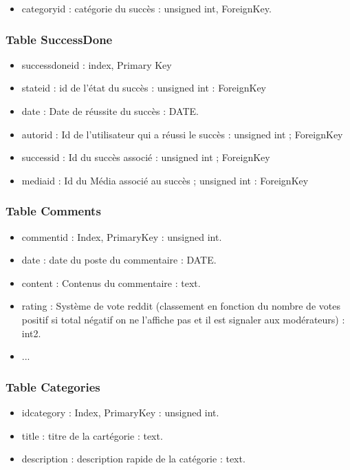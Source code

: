\documentclass[a4paper,10pt]{article}
\begin{document}
\begin{itemize}
\item categoryid : catégorie du succès : unsigned int, ForeignKey.
\end{itemize}

\subsubsection{Table SuccessDone}

\begin{itemize}
\item successdoneid : index, Primary Key
\item stateid : id de l'état du succès : unsigned int : ForeignKey 
\item date : Date de réussite du succès : DATE.
\item autorid : Id de l'utilisateur qui a réussi le succès : unsigned int ; ForeignKey
\item successid : Id du succès associé : unsigned int ; ForeignKey
\item mediaid : Id du Média associé au succès ; unsigned int : ForeignKey
\end{itemize}

\subsubsection{Table Comments}

\begin{itemize}
\item commentid : Index, PrimaryKey : unsigned int.
\item date : date du poste du commentaire : DATE.
\item content : Contenus du commentaire : text.
\item rating : Système de vote reddit (classement en fonction du nombre de votes positif si total négatif on ne l'affiche pas et il est signaler aux modérateurs) : int2.
\item ...
\end{itemize}

\subsubsection{Table Categories}

\begin{itemize}
\item idcategory : Index, PrimaryKey : unsigned int.
\item title : titre de la cartégorie : text.
\item description : description rapide de la catégorie : text.
\end{itemize}
\end{document}
